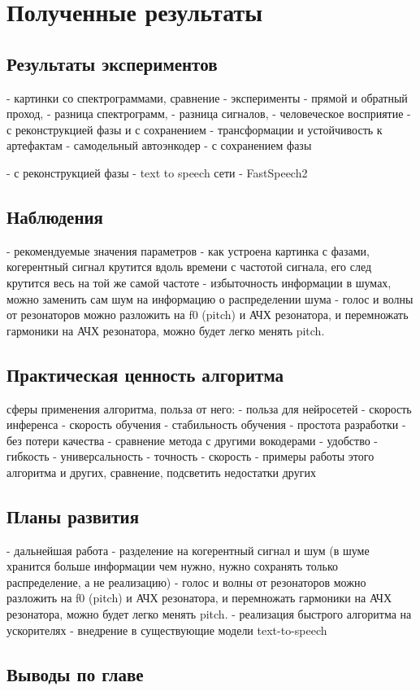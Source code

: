 \chapter{Полученные результаты}

\section{Результаты экспериментов}
\label{sec:sec_3_1}
\begin{markdown}
  - картинки со спектрограммами, сравнение
  - эксперименты
   - прямой и обратный проход, 
     - разница спектрограмм, 
     - разница сигналов, 
     - человеческое восприятие
     - с реконструкцией фазы и с сохранением
     - трансформации и устойчивость к артефактам
   - самодельный автоэнкодер 
     - с сохранением фазы

	 - с реконструкцией фазы
   - text to speech сети
     - FastSpeech2
\end{markdown}

\section{Наблюдения}
\begin{markdown}
  - рекомендуемые значения параметров
  - как устроена картинка с фазами, когерентный сигнал крутится вдоль времени с частотой сигнала, его след крутится весь на той же самой частоте
  - избыточность информации в шумах, можно заменить сам шум на информацию о распределении шума
  - голос и волны от резонаторов можно разложить на f0 (pitch) и АЧХ резонатора, и перемножать гармоники на АЧХ резонатора, можно будет легко менять pitch.
\end{markdown}

\section{Практическая ценность алгоритма}
\begin{markdown}
   сферы применения алгоритма, польза от него:
    - польза для нейросетей
      - скорость инференса
      - скорость обучения
      - стабильность обучения
      - простота разработки
      - без потери качества
  - сравнение метода с другими вокодерами
    - удобство
    - гибкость
    - универсальность
    - точность
    - скорость
  - примеры работы этого алгоритма и других, сравнение, подсветить недостатки других
\end{markdown}

\section{Планы развития}
\begin{markdown}
 - дальнейшая работа
   - разделение на когерентный сигнал и шум (в шуме хранится больше информации чем нужно, нужно сохранять только распределение, а не реализацию)
   - голос и волны от резонаторов можно разложить на f0 (pitch) и АЧХ резонатора, и перемножать гармоники на АЧХ резонатора, можно будет легко менять pitch.
   - реализация быстрого алгоритма на ускорителях
   - внедрение в существующие модели text-to-speech
\end{markdown}

\section{Выводы по главе}